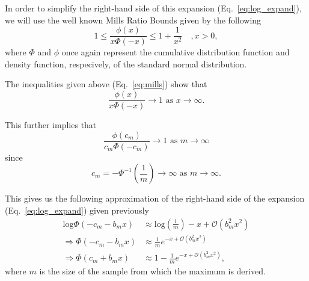 \documentclass[aos]{imsart}
\begin{document}
In order to simplify the right-hand side of this expansion (Eq.~\ref{eq:log_expand}), we will use the well known Mills Ratio Bounds \cite{chatterjee2014} given by the following
%
\begin{equation}\label{eq:mills}
1 \leq \frac{\phi(x)}{x \Phi(-x)} \leq 1 + \frac{1}{x^2} \quad , x > 0,
\end{equation}
%
where $\Phi$ and $\phi$ once again represent the cumulative distribution function and density function, respecively, of the standard normal distribution.

The inequalities given above (Eq.~\ref{eq:mills}) show that 
%
\[\frac{\phi(x)}{x \Phi(-x)} \rightarrow 1 \text{ as } x \rightarrow \infty.
\] 

This further implies that 
%
\[
\frac{\phi(c_m)}{c_m \Phi(-c_m)} \rightarrow 1 \text{ as } m \rightarrow \infty
\] 
%
since 
%
\[
c_m = -\Phi^{-1}\left(\frac{1}{m}\right) \rightarrow \infty \text{ as } m \rightarrow \infty.
\] 

This gives us the following approximation of the right-hand side of the expansion (Eq.~\ref{eq:log_expand}) given previously
%
\begin{equation}\label{eq:approx_log_expand}
\begin{aligned}
\text{log}\Phi(-c_m - b_m x) &\approx \text{log}\left(\frac{1}{m}\right) - x + \mathcal{O}(b^2_m x^2) \\
\Rightarrow \Phi(-c_m - b_m x) &\approx \frac{1}{m}e^{-x + \mathcal{O}(b^2_m x^2)} \\
\Rightarrow \Phi(c_m + b_m x) &\approx 1 - \frac{1}{m}e^{-x + \mathcal{O}(b^2_m x^2)},
\end{aligned}
\end{equation}
%
where $m$ is the size of the sample from which the maximum is derived.
\end{document}

